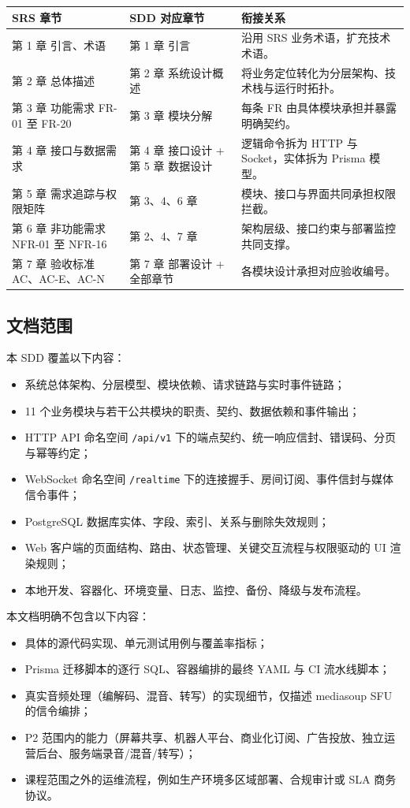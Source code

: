 \noindent\begin{tabularx}{\textwidth}{L{4cm}L{4.5cm}Y}
  \toprule
  SRS 章节 & SDD 对应章节 & 衔接关系 \\
  \midrule
  第 1 章 引言、术语 & 第 1 章 引言 & 沿用 SRS 业务术语，扩充技术术语。 \\
  第 2 章 总体描述 & 第 2 章 系统设计概述 & 将业务定位转化为分层架构、技术栈与运行时拓扑。 \\
  第 3 章 功能需求 FR-01 至 FR-20 & 第 3 章 模块分解 & 每条 FR 由具体模块承担并暴露明确契约。 \\
  第 4 章 接口与数据需求 & 第 4 章 接口设计 + 第 5 章 数据设计 & 逻辑命令拆为 HTTP 与 Socket，实体拆为 Prisma 模型。 \\
  第 5 章 需求追踪与权限矩阵 & 第 3、4、6 章 & 模块、接口与界面共同承担权限拦截。 \\
  第 6 章 非功能需求 NFR-01 至 NFR-16 & 第 2、4、7 章 & 架构层级、接口约束与部署监控共同支撑。 \\
  第 7 章 验收标准 AC、AC-E、AC-N & 第 7 章 部署设计 + 全部章节 & 各模块设计承担对应验收编号。 \\
  \bottomrule
\end{tabularx}

\subsection{文档范围}
本 SDD 覆盖以下内容：

\begin{itemize}
  \item 系统总体架构、分层模型、模块依赖、请求链路与实时事件链路；
  \item 11 个业务模块与若干公共模块的职责、契约、数据依赖和事件输出；
  \item HTTP API 命名空间 \texttt{/api/v1} 下的端点契约、统一响应信封、错误码、分页与幂等约定；
  \item WebSocket 命名空间 \texttt{/realtime} 下的连接握手、房间订阅、事件信封与媒体信令事件；
  \item PostgreSQL 数据库实体、字段、索引、关系与删除失效规则；
  \item Web 客户端的页面结构、路由、状态管理、关键交互流程与权限驱动的 UI 渲染规则；
  \item 本地开发、容器化、环境变量、日志、监控、备份、降级与发布流程。
\end{itemize}

本文档明确不包含以下内容：

\begin{itemize}
  \item 具体的源代码实现、单元测试用例与覆盖率指标；
  \item Prisma 迁移脚本的逐行 SQL、容器编排的最终 YAML 与 CI 流水线脚本；
  \item 真实音频处理（编解码、混音、转写）的实现细节，仅描述 mediasoup SFU 的信令编排；
  \item P2 范围内的能力（屏幕共享、机器人平台、商业化订阅、广告投放、独立运营后台、服务端录音/混音/转写）；
  \item 课程范围之外的运维流程，例如生产环境多区域部署、合规审计或 SLA 商务协议。
\end{itemize}

